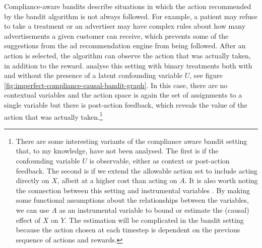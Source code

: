 \documentclass[11pt,a4paper,twoside]{report}
\theoremstyle{plain}
\theoremstyle{definition}
\begin{document}
Compliance-aware bandits describe situations in which the action recommended by the bandit algorithm is not always followed. For example, a patient may refuse to take a treatment or an advertiser may have complex rules about how many advertisements a given customer can receive, which prevents some of the suggestions from the ad recommendation engine from being followed. After an action is selected, the algorithm can observe the action that was actually taken, in addition to the reward. \citet{DellaPenna2016} analyse this setting with binary treatments both with and without the presence of a latent confounding variable $U$, see figure \ref{fig:imperfect-compliance-causal-bandit-graph}. In this case, there are no contextual variables and the action space is again the set of assignments to a single variable but there is post-action feedback, which reveals the value of the action that was actually taken.\footnote{There are some interesting variants of the compliance aware bandit setting that, to my knowledge, have not been analysed. The first is if the confounding variable $U$ is observable, either as context or post-action feedback. The second is if we extend the allowable action set to include acting directly on $X$, albeit at a higher cost than acting on $A$. It is also worth noting the connection between this setting and instrumental variables \cite{balke1997bounds}. By making some functional assumptions about the relationships between the variables, we can use $A$ as an instrumental variable to bound or estimate the (causal) effect of $X$ on $Y$. The estimation will be complicated in the bandit setting because the action chosen at each timestep is dependent on the previous sequence of actions and rewards.}
\end{document}
